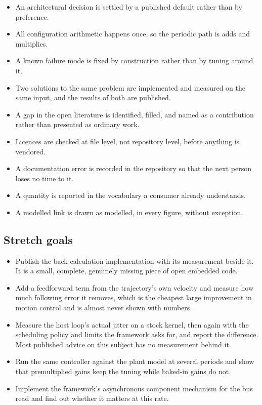 \begin{itemize}
\item An architectural decision is settled by a published default rather than by
preference.
\item All configuration arithmetic happens once, so the periodic path is adds
and multiplies.
\item A known failure mode is fixed by construction rather than by tuning around
it.
\item Two solutions to the same problem are implemented and measured on the same
input, and the results of both are published.
\item A gap in the open literature is identified, filled, and named as a
contribution rather than presented as ordinary work.
\item Licences are checked at file level, not repository level, before anything
is vendored.
\item A documentation error is recorded in the repository so that the next
person loses no time to it.
\item A quantity is reported in the vocabulary a consumer already understands.
\item A modelled link is drawn as modelled, in every figure, without exception.
\end{itemize}

\subsection*{Stretch goals}

\begin{itemize}
\item Publish the back-calculation implementation with its measurement beside
it. It is a small, complete, genuinely missing piece of open embedded code.
\item Add a feedforward term from the trajectory's own velocity and measure how
much following error it removes, which is the cheapest large improvement in
motion control and is almost never shown with numbers.
\item Measure the host loop's actual jitter on a stock kernel, then again with
the scheduling policy and limits the framework asks for, and report the
difference. Most published advice on this subject has no measurement behind it.
\item Run the same controller against the plant model at several periods and
show that premultiplied gains keep the tuning while baked-in gains do not.
\item Implement the framework's asynchronous component mechanism for the bus
read and find out whether it matters at this rate.
\end{itemize}

